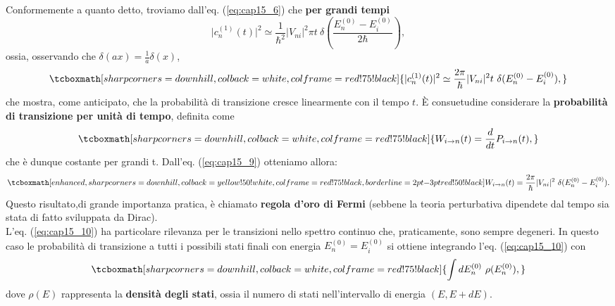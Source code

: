 Conformemente a quanto detto, troviamo dall'eq. (\ref{eq:cap15_6}) che \textbf{per grandi tempi}
	\begin{equation}
		\vert c_n ^{(1)} (t) \vert ^2 \simeq \frac{1}{\hbar ^2} \vert V_{ni} \vert ^2 \pi t\ \delta\left(\frac{E_n ^{(0)}-E_i ^{(0)}}{2\hbar} \right),
	\end{equation}
ossia, osservando che $\delta (ax) = \frac{1}{a} \delta (x)$,
	\begin{equation}
		\tcboxmath[sharp corners=downhill, colback=white, colframe=red!75!black]{
			\vert c_n ^{(1)} (t) \vert ^2 \simeq \frac{2\pi}{\hbar } \vert V_{ni} \vert ^2  t\ \delta (E_n ^{(0)}-E_i ^{(0)} ),
			}
	\label{eq:cap15_9}
	\end{equation}
che mostra, come anticipato, che la probabilità di transizione cresce linearmente con il tempo $t$. È consuetudine considerare la \textbf{probabilità di transizione per unità di tempo}, definita come
	\begin{equation}
		\tcboxmath[sharp corners=downhill, colback=white, colframe=red!75!black]{
			W_{i\rightarrow n} (t) =\frac{d}{dt} P_{i\rightarrow n} (t),
			}
	\end{equation}
che è dunque costante per grandi t. Dall'eq. (\ref{eq:cap15_9}) otteniamo allora:
	\begin{equation}
		\tcboxmath[enhanced, sharp corners=downhill, colback=yellow!50!white, colframe=red!75!black, borderline={2pt}{-3pt}{red!50!black}]{
			W_{i\rightarrow n} (t) = \frac{2\pi}{\hbar } \vert V_{ni} \vert ^2\ \delta (E_n ^{(0)}-E_i ^{(0)} ).
			}
	\label{eq:cap15_10}
	\end{equation}
Questo risultato,di grande importanza pratica, è chiamato \textbf{regola d'oro di Fermi} (sebbene la teoria perturbativa dipendete dal tempo sia stata di fatto sviluppata da Dirac).\\
		
L'eq. (\ref{eq:cap15_10}) ha particolare rilevanza per le transizioni nello spettro continuo che, praticamente, sono sempre degeneri. In questo caso le probabilità di transizione a tutti i possibili stati finali con energia $E_n ^{(0)}= E_i ^{(0)}$ si ottiene integrando l'eq. (\ref{eq:cap15_10}) con
	\begin{equation}
		\tcboxmath[sharp corners=downhill, colback=white, colframe=red!75!black]{
			\int dE_n ^{(0)} \ \rho (E_n ^{(0)}),
			}
	\end{equation}
dove $\rho (E)$ rappresenta la \textbf{densità degli stati}, ossia il numero di stati nell'intervallo di energia $(E, E+dE)$.
